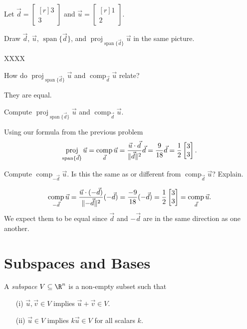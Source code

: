 \documentclass{problemset}
\DeclareMathOperator{\Span}{span}
\DeclareMathOperator{\Comp}{comp}
\DeclareMathOperator{\Proj}{proj}
\newcommand{\mat}[1]{\begin{bmatrix*}[r]#1\end{bmatrix*}}
\DeclarePairedDelimiter\norm{\lVert}{\rVert}
\begin{document}
	\newpage
	\question
	Let $\vec d=\mat{3\\3}$ and $\vec u=\mat{1\\2}$.
	\begin{parts}
		\item Draw $\vec d$, $\vec u$, $\Span\{\vec d\}$, and $\Proj_{\Span\{\vec d\}}\vec u$
			in the same picture.
			\begin{solution}
				XXXX
			\end{solution}
		\item How do $\Proj_{\Span\{\vec d\}}\vec u$ and $\Comp_{\vec d}\vec u$ relate?
			\begin{solution}[inline]
				They are equal.
			\end{solution}
		\item Compute $\Proj_{\Span\{\vec d\}}\vec u$ and $\Comp_{\vec d}\vec u$.
			\begin{solution}
				Using our formula from the previous problem
				\[
					\Proj_{\Span\{\vec d\}}\vec u
					=\Comp_{\vec d}\vec u
					=\frac{\vec u\cdot \vec d}{\norm{\vec d}^2} \vec d
					=\frac{9}{18}\vec d = \frac{1}{2}\mat{3\\3}.
				\]
			\end{solution}
		\item Compute $\Comp_{-\vec d}\vec u$. Is this the same as or different from 
			$\Comp_{\vec d}\vec u$? Explain.
			\begin{solution}
				\[
					\Comp_{-\vec d}\vec u
					=\frac{\vec u\cdot (-\vec d)}{\norm{-\vec d}^2} (-\vec d)
					=\frac{-9}{18}(-\vec d) = \frac{1}{2}\mat{3\\3}
					=\Comp_{\vec d}\vec u.
				\]
				We expect them to be equal since $\vec d$ and $-\vec d$ are 
				in the same direction as one another.
			\end{solution}
	\end{parts}


\section*{Subspaces and Bases}
	\vspace{-1em}
	\begin{definition}[Subspace]
		A \emph{subspace} $V\subseteq \R^n$ is a non-empty subset such that
		\begin{enumerate}
			\item[(i)] $\vec u,\vec v\in V$ implies $\vec u+\vec v\in V$.
			\item[(ii)] $\vec u\in V$ implies $k\vec u\in V$ for all scalars $k$.
		\end{enumerate}
	\end{definition}
\end{document}
